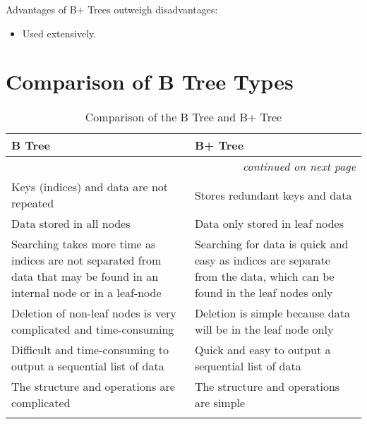 Advantages of B+ Trees outweigh disadvantages:
\begin{itemize}
    \item Used extensively.
\end{itemize}

\section{Comparison of B Tree Types}
{\RaggedRight \centering
    \begin{longtable}{p{} p{}}
    \textbf{B Tree} & \textbf{B+ Tree}\\
    \hline
    \hline
    \endhead

    \multicolumn{2}{r}{\footnotesize\itshape continued on next page}\\
    \endfoot 

    \endlastfoot

    Keys (indices) and data are not repeated & Stores redundant keys and data\\
    \hline
    Data stored in all nodes & Data only stored in leaf nodes\\
    \hline
    Searching takes more time as indices are not separated from data that may be found in an internal node or in a leaf-node & Searching for data is quick and easy as indices are separate from the data, which can be found in the leaf nodes only\\
    \hline
    Deletion of non-leaf nodes is very complicated and time-consuming & Deletion is simple because data will be in the leaf node only\\
    \hline
    Difficult and time-consuming to output a sequential list of data & Quick and easy to output a sequential list of data\\
    \hline
    The structure and operations are complicated & The structure and operations are simple\\
    \hline
    
    \caption{Comparison of the B Tree and B+ Tree}
    \end{longtable}
} %